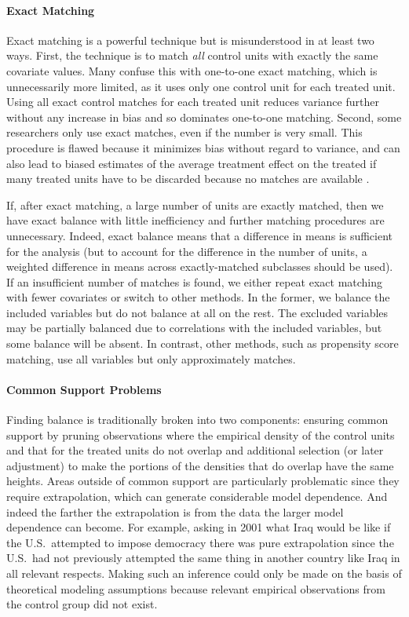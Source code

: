 \documentclass[11pt,titlepage]{article}
\begin{document}
\paragraph{Exact Matching}  
Exact matching is a powerful technique but is misunderstood in at
least two ways.  First, the technique is to match \emph{all} control
units with exactly the same covariate values.  Many confuse this with
one-to-one exact matching, which is unnecessarily more limited, as it
uses only one control unit for each treated unit.  Using all exact
control matches for each treated unit reduces variance further without
any increase in bias and so dominates one-to-one matching.  Second,
some researchers only use exact matches, even if the number is very
small.  This procedure is flawed because it minimizes bias without
regard to variance, and can also lead to biased estimates of the
average treatment effect on the treated if many treated units have to
be discarded because no matches are available \citep{RosRub85b}.

If, after exact matching, a large number of units are exactly matched,
then we have exact balance with little inefficiency and further
matching procedures are unnecessary.  Indeed, exact balance means
that a difference in means is sufficient for the analysis (but to
account for the difference in the number of units, a weighted
difference in means across exactly-matched subclasses should be used).
If an insufficient number of matches is found, we either repeat exact
matching with fewer covariates or switch to other methods.  In the
former, we balance the included variables but do not balance at all on
the rest.  The excluded variables may be partially balanced due to
correlations with the included variables, but some balance will be
absent.  In contrast, other methods, such as propensity score
matching, use all variables but only approximately matches.

\paragraph{Common Support Problems}
Finding balance is traditionally broken into two components: ensuring
common support by pruning observations where the empirical density of
the control units and that for the treated units do not overlap and
additional selection (or later adjustment) to make the portions of the
densities that do overlap have the same heights.  Areas outside of
common support are particularly problematic since they require
extrapolation, which can generate considerable model dependence.  And
indeed the farther the extrapolation is from the data the larger model
dependence can become.  For example, asking in 2001 what Iraq would be
like if the U.S.\ attempted to impose democracy there was pure
extrapolation since the U.S.\ had not previously attempted the same
thing in another country like Iraq in all relevant respects.  Making
such an inference could only be made on the basis of theoretical
modeling assumptions because relevant empirical observations from the
control group did not exist.
\end{document}
